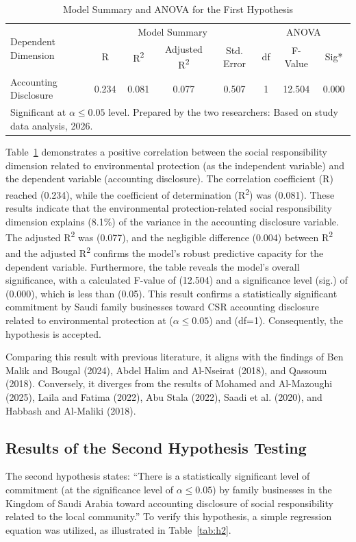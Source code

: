 \documentclass{NSP1}
\begin{document}
\begin{table}[!ht]
\centering
\caption{Model Summary and ANOVA for the First Hypothesis}
\label{tab:h1}
\begin{tabular}{lccccccc}
\hline
\multirow{2}{*}{Dependent Dimension} & \multicolumn{4}{c}{Model Summary} & \multicolumn{3}{c}{ANOVA} \\
 & R & R\textsuperscript{2} & Adjusted R\textsuperscript{2} & Std. Error & df & F-Value & Sig* \\
\hline
Accounting Disclosure & 0.234 & 0.081 & 0.077 & 0.507 & 1 & 12.504 & 0.000 \\
\hline
\multicolumn{8}{l}{\footnotesize *Significant at $\alpha \le 0.05$ level. Prepared by the two researchers: Based on study data analysis, 2026.} \\
\end{tabular}
\end{table}

Table~\ref{tab:h1} demonstrates a positive correlation between the social responsibility dimension related to environmental protection (as the independent variable) and the dependent variable (accounting disclosure). The correlation coefficient (R) reached (0.234), while the coefficient of determination (R\textsuperscript{2}) was (0.081). These results indicate that the environmental protection-related social responsibility dimension explains (8.1\%) of the variance in the accounting disclosure variable. The adjusted R\textsuperscript{2} was (0.077), and the negligible difference (0.004) between R\textsuperscript{2} and the adjusted R\textsuperscript{2} confirms the model's robust predictive capacity for the dependent variable. Furthermore, the table reveals the model's overall significance, with a calculated F-value of (12.504) and a significance level (sig.) of (0.000), which is less than (0.05). This result confirms a statistically significant commitment by Saudi family businesses toward CSR accounting disclosure related to environmental protection at ($\alpha \le 0.05$) and (df=1). Consequently, the hypothesis is accepted.

Comparing this result with previous literature, it aligns with the findings of Ben Malik and Bougal (2024), Abdel Halim and Al-Nseirat (2018), and Qassoum (2018). Conversely, it diverges from the results of Mohamed and Al-Mazoughi (2025), Laila and Fatima (2022), Abu Stala (2022), Saadi et al. (2020), and Habbash and Al-Maliki (2018).

\subsection{Results of the Second Hypothesis Testing}
The second hypothesis states: ``There is a statistically significant level of commitment (at the significance level of $\alpha \le 0.05$) by family businesses in the Kingdom of Saudi Arabia toward accounting disclosure of social responsibility related to the local community.'' To verify this hypothesis, a simple regression equation was utilized, as illustrated in Table~\ref{tab:h2}.
\end{document}
